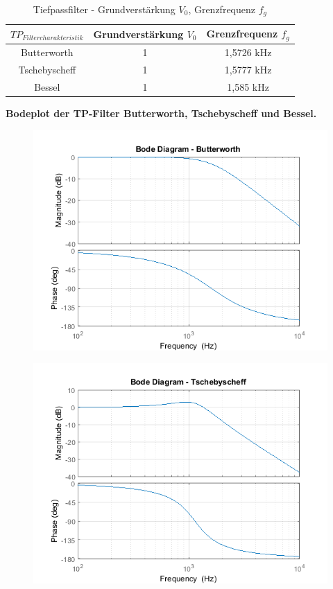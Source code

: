 \begin{table}[h]
	\centering
	\begin{tabular}{c|c|c}
		$TP_{Filtercharakteristik}$ & Grundverstärkung $V_{0}$	& Grenzfrequenz $f_{g}$	\\
		\hline
		\hline
		Butterworth	& 1	& 1,5726 kHz	\\
		Tschebyscheff	& 1	& 1,5777 kHz	\\
		Bessel	& 1	& 1,585 kHz 	\\
	\end{tabular}
	\caption{Tiefpassfilter - Grundverstärkung $V_{0}$, Grenzfrequenz $f_{g}$ }
	\label{tab:Tiefpaesse_Grundverstaerkung}
\end{table}

\newpage

\textbf{Bodeplot der TP-Filter Butterworth, Tschebyscheff und Bessel.}

\begin{figure}[h]
\centering
\includegraphics[width=0.7\linewidth]{Bilder/TP_Butterworth}
\caption{}
\label{fig:TP_Butterworth}
\end{figure}

\begin{figure}[h]
\centering
\includegraphics[width=0.7\linewidth]{Bilder/TP_Tschebyscheff}
\caption{}
\label{fig:TP_Tschebyscheff}
\end{figure}


